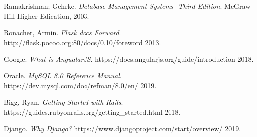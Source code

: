 \documentclass{article}
\begin{document}
  \begin{thebibliography}{4}

    Ramakrishnan; Gehrke.
    \textit{Database Management Systems- Third Edition}.
    McGraw-Hill Higher Edication, 2003.

    Ronacher, Armin.
    \textit{Flask docs Forward}.
    http://flask.pocoo.org:80/docs/0.10/foreword
    2013.

    Google.
    \textit{What is AngualarJS}.
    https://docs.angularjs.org/guide/introduction
    2018.

    Oracle.
    \textit{MySQL 8.0 Reference Manual}.
    https://dev.mysql.com/doc/refman/8.0/en/
    2019.

    Bigg, Ryan.
    \textit{Getting Started with Rails}.
    https://guides.rubyonrails.org/getting\_started.html
    2018.

    Django.
    \textit{Why Django?}
    https://www.djangoproject.com/start/overview/
    2019.

  \end{thebibliography}
\end{document}
